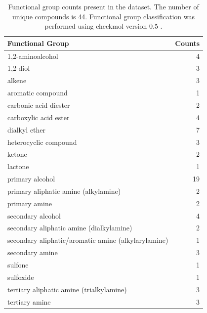 \documentclass[aps,pre,twocolumn,nofootinbib,superscriptaddress,linenumbers]{revtex4-1}
\begin{document}
\begin{table}
\begin{tabular}{lr}
\toprule
Functional Group &    Counts \\
\midrule
1,2-aminoalcohol                                    &   4 \\
1,2-diol                                            &   3 \\
alkene                                              &   3 \\
aromatic compound                                   &   1 \\
carbonic acid diester                               &   2 \\
carboxylic acid ester                               &   4 \\
dialkyl ether                                       &   7 \\
heterocyclic compound                               &   3 \\
ketone                                              &   2 \\
lactone                                             &   1 \\
primary alcohol                                     &  19 \\
primary aliphatic amine (alkylamine)                &   2 \\
primary amine                                       &   2 \\
secondary alcohol                                   &   4 \\
secondary aliphatic amine (dialkylamine)            &   2 \\
secondary aliphatic/aromatic amine (alkylarylamine) &   1 \\
secondary amine                                     &   3 \\
sulfone                                             &   1 \\
sulfoxide                                           &   1 \\
tertiary aliphatic amine (trialkylamine)            &   3 \\
tertiary amine                                      &   3 \\
\bottomrule
\end{tabular}
\caption{Functional group counts present in the dataset.  
The number of unique compounds is 44.  
Functional group classification was performed using checkmol version 0.5 \cite{haider2010functionality}.}
\label{table:FunctionalGroups}
\end{table}
\end{document}
